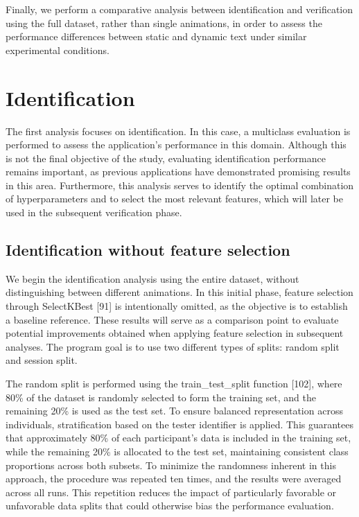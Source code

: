 \documentclass[12pt]{report}
\begin{document}
Finally, we perform a comparative analysis between identification and verification using the full dataset, rather than single animations, in order to assess the performance differences between static and dynamic text under similar experimental conditions.

\section{Identification}
The first analysis focuses on identification.
In this case, a multiclass evaluation is performed to assess the application's performance in this domain. 
Although this is not the final objective of the study, evaluating identification performance remains important, as previous applications have demonstrated promising results in this area.
Furthermore, this analysis serves to identify the optimal combination of hyperparameters and to select the most relevant features, which will later be used in the subsequent verification phase.

\subsection{Identification without feature selection}
\label{subsec:id_fs_ch}

We begin the identification analysis using the entire dataset, without distinguishing between different animations.
In this initial phase, feature selection through SelectKBest [91] is intentionally omitted, as the objective is to establish a baseline reference. 
These results will serve as a comparison point to evaluate potential improvements obtained when applying feature selection in subsequent analyses.
The program goal is to use two different types of splits: random split and session split.

The random split is performed using the train\_test\_split function [102], where 80\% of the dataset is randomly selected to form the training set, and the remaining 20\% is used as the test set.
To ensure balanced representation across individuals, stratification based on the tester identifier is applied.
This guarantees that approximately 80\% of each participant's data is included in the training set, while the remaining 20\% is allocated to the test set, maintaining consistent class proportions across both subsets.
To minimize the randomness inherent in this approach, the procedure was repeated ten times, and the results were averaged across all runs.
This repetition reduces the impact of particularly favorable or unfavorable data splits that could otherwise bias the performance evaluation.
\end{document}
